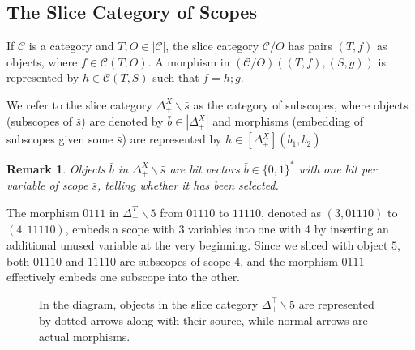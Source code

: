 \documentclass[runningheads]{llncs}
\newtheorem*{remark}{Remark}
\begin{document}
\subsection{The Slice Category of Scopes}
\begin{definition}
  If $𝒞$ is a category and $T, O ∈ |𝒞|$, the slice category $𝒞/O$ has pairs $(T, f)$ as objects, where $f ∈ 𝒞(T, O)$. A morphism in $(𝒞/O)((T, f), (S, g))$ is represented by $h ∈ 𝒞(T, S)$ such that $f = h;g$.
\end{definition}
\begin{definition}
  We refer to the slice category $Δ_+^X∖\bar{s}$ as the category of subscopes, where objects (subscopes of $\bar{s}$) are denoted by $\bar{b} ∈ |Δ_+^X|$ and morphisms (embedding of subscopes given some $\bar{s}$) are represented by $h ∈ [Δ_+^X](\bar{b}_1, \bar{b}_2)$.
\end{definition}
\begin{remark}
  Objects $\bar{b}$ in $Δ_+^X∖\bar{s}$ are \emph{bit vectors} $\bar{b} ∈ \{0, 1\}^*$ with one bit per variable of scope $\bar{s}$, telling whether it has been selected.
\end{remark}
\begin{example}
  The morphism $0111$ in $Δ_+^T∖5$ from $01110$ to $11110$, denoted as $(3, 01110)$ to $(4, 11110)$, embeds a scope with 3 variables into one with 4 by inserting an additional unused variable at the very beginning. 
  Since we sliced with object $5$, both $01110$ and $11110$ are subscopes of scope $4$, and the morphism $0111$ effectively embeds one subscope into the other.
  \begin{figure}[ht]
    \centering
    \caption{In the diagram, objects in the slice category $Δ_+^⊤∖5$ are represented by dotted arrows along with their source, while normal arrows are actual morphisms.}
    \label{fig:ex3}
  \end{figure}
\end{example}
\end{document}
